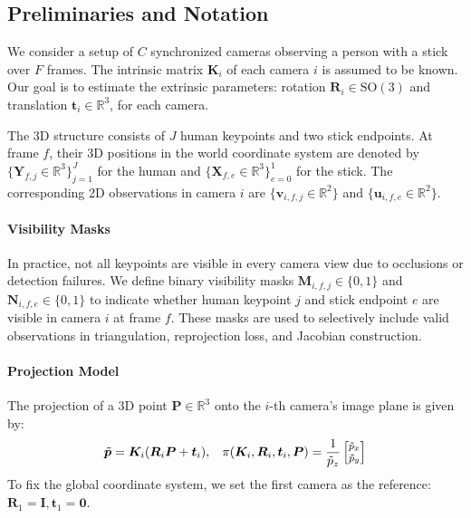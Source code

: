 \documentclass[a4paper, 10pt, conference]{ieeeconf}      %
\newcommand{\SO}{\mathrm{SO}(3)}
\newcommand{\vect}[1]{\bm{#1}}
\newcommand{\mat}[1]{\bm{#1}}
\newcommand{\proj}{\pi}
\begin{document}
\subsection{Preliminaries and Notation}

We consider a setup of $C$ synchronized cameras observing a person with a stick over $F$ frames. The intrinsic matrix $\mat{K}_i$ of each camera $i$ is assumed to be known. Our goal is to estimate the extrinsic parameters: rotation $\mat{R}_i \in \SO$ and translation $\vect{t}_i \in \mathbb{R}^3$, for each camera.

The 3D structure consists of $J$ human keypoints and two stick endpoints. At frame $f$, their 3D positions in the world coordinate system are denoted by $\{\vect{Y}_{f,j} \in \mathbb{R}^3\}_{j=1}^J$ for the human and $\{\vect{X}_{f,e} \in \mathbb{R}^3\}_{e=0}^1$ for the stick. The corresponding 2D observations in camera $i$ are $\{\vect{v}_{i,f,j} \in \mathbb{R}^2\}$ and $\{\vect{u}_{i,f,e} \in \mathbb{R}^2\}$.

\paragraph{Visibility Masks}
In practice, not all keypoints are visible in every camera view due to occlusions or detection failures. We define binary visibility masks $\mat{M}_{i,f,j} \in \{0,1\}$ and $\mat{N}_{i,f,e} \in \{0,1\}$ to indicate whether human keypoint $j$ and stick endpoint $e$ are visible in camera $i$ at frame $f$. These masks are used to selectively include valid observations in triangulation, reprojection loss, and Jacobian construction.

\paragraph{Projection Model}
The projection of a 3D point $\vect{P} \in \mathbb{R}^3$ onto the $i$-th camera's image plane is given by:
\begin{equation} \footnotesize 
\label{eq:projection}
\tilde{\vect{p}} = \mat{K}_i (\mat{R}_i \vect{P} + \vect{t}_i), \quad
\proj(\mat{K}_i, \mat{R}_i, \vect{t}_i, \vect{P}) = \frac{1}{\tilde{p}_z} \begin{bmatrix} \tilde{p}_x \\ \tilde{p}_y \end{bmatrix}
\end{equation}
To fix the global coordinate system, we set the first camera as the reference: $\mat{R}_1 = \mat{I}, \vect{t}_1 = \vect{0}$.
\end{document}
